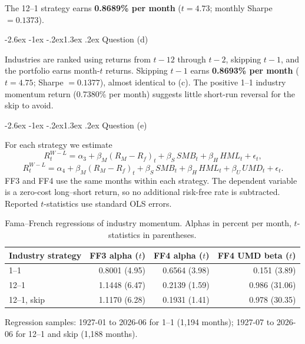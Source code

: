 \documentclass[11pt]{article}
\makeatletter
\renewcommand\section{\@startsection{section}{1}{0pt}%
  {-2.6ex \@plus -1ex \@minus -.2ex}{1.3ex \@plus .2ex}%
  {\normalfont\scshape\large\color{psink}}}   %
\makeatother
\begin{document}
The 12--1 strategy earns \textbf{0.8689\% per month} ($t = 4.73$; monthly Sharpe $= 0.1373$).

\section{Question (d)}

Industries are ranked using returns from $t-12$ through $t-2$, skipping $t-1$, and the portfolio earns month-$t$ returns. Skipping $t-1$ earns \textbf{0.8693\% per month} ($t = 4.75$; Sharpe $= 0.1377$), almost identical to (c). The positive 1--1 industry momentum return (0.7380\% per month) suggests little short-run reversal for the skip to avoid.

\section{Question (e)}

For each strategy we estimate
\[
R^{W-L}_t = \alpha_3 + \beta_M (R_M-R_f)_t + \beta_S\, SMB_t + \beta_H\, HML_t + \epsilon_t,
\]
\[
R^{W-L}_t = \alpha_4 + \beta_M (R_M-R_f)_t + \beta_S\, SMB_t + \beta_H\, HML_t + \beta_U\, UMD_t + \epsilon_t .
\]
FF3 and FF4 use the same months within each strategy. The dependent variable is a zero-cost long--short return, so no additional risk-free rate is subtracted. Reported $t$-statistics use standard OLS errors.

\begin{table}[H]
\centering
\caption{Fama--French regressions of industry momentum. Alphas in percent per month, $t$-statistics in parentheses.}
\small
\begin{tabular}{lrrr}
\toprule
Industry strategy & FF3 alpha ($t$) & FF4 alpha ($t$) & FF4 UMD beta ($t$) \\
\midrule
1--1 & 0.8001 (4.95) & 0.6564 (3.98) & 0.151 (3.89) \\
12--1 & 1.1448 (6.47) & 0.2139 (1.59) & 0.986 (31.06) \\
12--1, skip & 1.1170 (6.28) & 0.1931 (1.41) & 0.978 (30.35) \\
\bottomrule
\end{tabular}
\vspace{2pt}\begin{minipage}{0.85\textwidth}\footnotesize
Regression samples: 1927-01 to 2026-06 for 1--1 (1,194 months); 1927-07 to 2026-06 for 12--1 and skip (1,188 months).
\end{minipage}
\end{table}
\end{document}
